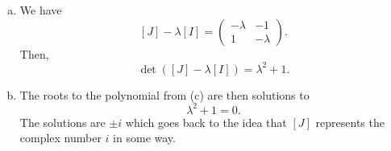 \documentclass[12pt]{article} %
\begin{document}
\begin{solution}
\begin{enumerate}[(a)]
\[\begin{tikzpicture}
        \draw[thin,gray!40] (-2,-2) grid (2,2);
        \draw[<->] (-2,0)--(2,0) node[right]{$x$};
        \draw[<->] (0,-2)--(0,2) node[above]{$y$};
        \draw[line width=2pt,blue,-stealth](0,0)--(0,1) node[anchor=west] at (0,.5){$J(\xhat)$};
        \draw[line width=2pt, red, -stealth](0,0)--(-1,0) node[anchor=north] at (-.5,0){$J(\yhat)$};
        \draw[line width=2pt, red, -stealth](0,1)--(-1,1) node[anchor=north] at (1,4){};
        \draw[line width=2pt, blue, -stealth](-1,0)--(-1,1) node[anchor=south] at (1,4){};
        \end{tikzpicture}
        \]
    We realize now that the parallelogram we had prior was only rotated and the area of the transformed parallelogram is unchanged. So, $[J]$ does not distort areas.

    \item We have
    \[
        [J] - \lambda [I] = \begin{pmatrix} -\lambda & -1 \\ 1 & -\lambda \end{pmatrix}.
    \]
    Then,
    \[
        \det([J]-\lambda[I]) = \lambda^2 + 1.
    \]
    \item The roots to the polynomial from (c) are then solutions to 
    \[
    \lambda^2+1=0.
    \]
    The solutions are $\pm i$ which goes back to the idea that $[J]$ represents the complex number $i$ in some way.
\end{enumerate}
\end{solution}
\end{document}
